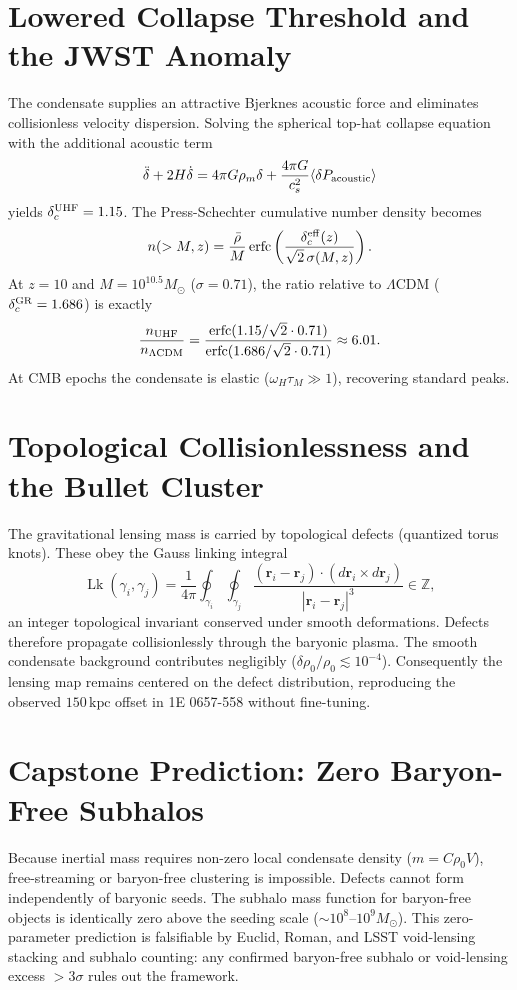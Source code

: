 \documentclass[reprint,amsmath,amssymb,aps,prl,superscriptaddress]{revtex4-2}
\begin{document}
\section{Lowered Collapse Threshold and the JWST Anomaly}
\label{sec:jwst}

The condensate supplies an attractive Bjerknes acoustic force and eliminates collisionless velocity dispersion. Solving the spherical top-hat collapse equation with the additional acoustic term
\[
\ddot{\delta}+2H\dot{\delta}=4\pi G\rho_m\delta+\frac{4\pi G}{c_s^2}\langle\delta P_{\rm acoustic}\rangle
\]
yields $\delta_c^{\rm UHF}=1.15$. The Press-Schechter cumulative number density becomes
\[
n(>M,z)=\frac{\bar{\rho}}{M}\operatorname{erfc}\left(\frac{\delta_c^{\rm eff}(z)}{\sqrt{2}\,\sigma(M,z)}\right).
\]
At $z=10$ and $M=10^{10.5}M_\odot$ ($\sigma=0.71$), the ratio relative to $\Lambda$CDM ($\delta_c^{\rm GR}=1.686$) is exactly
\[
\frac{n_{\rm UHF}}{n_{\Lambda{\rm CDM}}}=\frac{\operatorname{erfc}(1.15/\sqrt{2}\cdot0.71)}{\operatorname{erfc}(1.686/\sqrt{2}\cdot0.71)}\approx6.01.
\]
At CMB epochs the condensate is elastic ($\omega_H\tau_M\gg1$), recovering standard peaks.

\section{Topological Collisionlessness and the Bullet Cluster}
\label{sec:bullet}

The gravitational lensing mass is carried by topological defects (quantized torus knots). These obey the Gauss linking integral
\[
\operatorname{Lk}(\gamma_i,\gamma_j)=\frac{1}{4\pi}\oint_{\gamma_i}\oint_{\gamma_j}\frac{(\mathbf{r}_i-\mathbf{r}_j)\cdot(d\mathbf{r}_i\times d\mathbf{r}_j)}{|\mathbf{r}_i-\mathbf{r}_j|^3}\in\mathbb{Z},
\]
an integer topological invariant conserved under smooth deformations. Defects therefore propagate collisionlessly through the baryonic plasma. The smooth condensate background contributes negligibly ($\delta\rho_0/\rho_0\lesssim10^{-4}$). Consequently the lensing map remains centered on the defect distribution, reproducing the observed $150\,\text{kpc}$ offset in 1E 0657-558 without fine-tuning.

\section{Capstone Prediction: Zero Baryon-Free Subhalos}
\label{sec:zero-subhalos}

Because inertial mass requires non-zero local condensate density ($m=C\rho_0V$), free-streaming or baryon-free clustering is impossible. Defects cannot form independently of baryonic seeds. The subhalo mass function for baryon-free objects is identically zero above the seeding scale ($\sim10^8$--$10^9M_\odot$). This zero-parameter prediction is falsifiable by Euclid, Roman, and LSST void-lensing stacking and subhalo counting: any confirmed baryon-free subhalo or void-lensing excess $>3\sigma$ rules out the framework.
\end{document}
